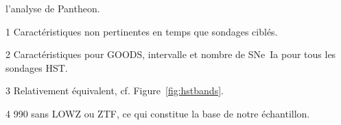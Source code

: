 \documentclass[../main/main.tex]{subfiles}
\begin{document}
\begin{table}[ht]
\begin{threeparttable}
\begin{tablenotes}[flushleft]
            l'analyse de Pantheon.
        \item [1] \small  Caractéristiques non pertinentes en temps que sondages
            ciblés.
        \item [2] \small Caractéristiques pour GOODS, intervalle et nombre de
            SNe~Ia pour tous les sondages HST.
        \item [3] \small Relativement équivalent, cf. Figure~\ref{fig:hstbands}.
        \item [4] \small 990 sans LOWZ ou ZTF, ce qui constitue la base de notre
            échantillon.
        \end{tablenotes}
    \end{threeparttable}
\end{table}
\shorthandon{:}
\vfill

\newpage

\thispagestyle{plain}
\vfill
\minilof
\vfill
\minilot
\vfill

% 
% 
\end{document}
